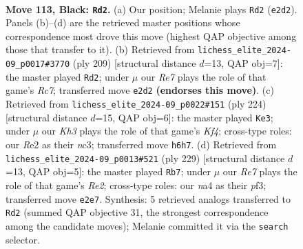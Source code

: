 \documentclass[11pt]{article}
\begin{document}
\clearpage

\begin{figure}[p]\centering
\begin{subfigure}{0.46\textwidth}\centering
\resizebox{\linewidth}{!}{%
\newchessgame
\chessboard[
  setfen={R7/6p1/5p1k/7p/N6P/6PK/4r3/8 b - - 51 113},
  showmover=false,
  pgfstyle=straightmove, color=movearrow, markmove={e2-d2}
]}
\caption{}
\end{subfigure}\hfill
\begin{subfigure}{0.46\textwidth}\centering
\resizebox{\linewidth}{!}{%
\newchessgame
\chessboard[
  setfen={8/R7/6pk/7p/7P/6PK/2r5/8 b - - 47 105},
  showmover=false,
  pgfstyle=straightmove, color=movearrow, markmove={c2-d2}
]}
\caption{}
\end{subfigure}
\\[4pt]
\begin{subfigure}{0.46\textwidth}\centering
\resizebox{\linewidth}{!}{%
\newchessgame
\chessboard[
  setfen={8/5k2/6p1/4P2p/3N1K1P/2n3P1/8/8 w - - 33 113},
  showmover=false,
  pgfstyle=straightmove, color=movearrow, markmove={f4-e3}
]}
\caption{}
\end{subfigure}\hfill
\begin{subfigure}{0.46\textwidth}\centering
\resizebox{\linewidth}{!}{%
\newchessgame
\chessboard[
  setfen={8/4r3/6pk/7p/R6P/5PP1/5K2/8 b - - 40 115},
  showmover=false,
  pgfstyle=straightmove, color=movearrow, markmove={e7-b7}
]}
\caption{}
\end{subfigure}
\caption{\textbf{Move 113, Black: \texttt{Rd2}.} (a) Our position; Melanie plays \texttt{Rd2} (\texttt{e2d2}). Panels (b)--(d) are the retrieved master positions whose correspondence most drove this move (highest QAP objective among those that transfer to it). (b) Retrieved from \texttt{lichess\_elite\_2024-09\_p0017\#3770} (ply 209) [structural distance $d$=13, QAP obj=7]: the master played \texttt{Rd2}; under $\mu$ our \emph{Re7} plays the role of that game's \emph{Rc7}; transferred move \texttt{e2d2} \textbf{(endorses this move)}. (c) Retrieved from \texttt{lichess\_elite\_2024-09\_p0022\#151} (ply 224) [structural distance $d$=15, QAP obj=6]: the master played \texttt{Ke3}; under $\mu$ our \emph{Kh3} plays the role of that game's \emph{Kf4}; cross-type roles: our \emph{R}e2 as their \emph{n}c3; transferred move \texttt{h6h7}. (d) Retrieved from \texttt{lichess\_elite\_2024-09\_p0013\#521} (ply 229) [structural distance $d$=13, QAP obj=5]: the master played \texttt{Rb7}; under $\mu$ our \emph{Re7} plays the role of that game's \emph{Re2}; cross-type roles: our \emph{n}a4 as their \emph{p}f3; transferred move \texttt{e2e7}. Synthesis: 5 retrieved analogs transferred to \texttt{Rd2} (summed QAP objective 31, the strongest correspondence among the candidate moves); Melanie committed it via the \texttt{search} selector.}
\label{fig:thought-m225}
\end{figure}
\end{document}
